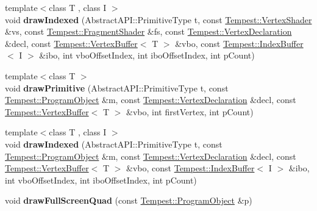 \begin{DoxyCompactItemize}
\item 
\hypertarget{class_tempest_1_1_device_a67e0ed5a99978956b5b11202548c1b2c}{{\footnotesize template$<$class T , class I $>$ }\\void {\bfseries draw\+Indexed} (Abstract\+A\+P\+I\+::\+Primitive\+Type t, const \hyperlink{class_tempest_1_1_vertex_shader}{Tempest\+::\+Vertex\+Shader} \&vs, const \hyperlink{class_tempest_1_1_fragment_shader}{Tempest\+::\+Fragment\+Shader} \&fs, const \hyperlink{class_tempest_1_1_vertex_declaration}{Tempest\+::\+Vertex\+Declaration} \&decl, const \hyperlink{class_tempest_1_1_vertex_buffer}{Tempest\+::\+Vertex\+Buffer}$<$ T $>$ \&vbo, const \hyperlink{class_tempest_1_1_index_buffer}{Tempest\+::\+Index\+Buffer}$<$ I $>$ \&ibo, int vbo\+Offset\+Index, int ibo\+Offset\+Index, int p\+Count)}\label{class_tempest_1_1_device_a67e0ed5a99978956b5b11202548c1b2c}

\item 
\hypertarget{class_tempest_1_1_device_a8d49c4eb70e1c6203ee73cff3f8f007d}{{\footnotesize template$<$class T $>$ }\\void {\bfseries draw\+Primitive} (Abstract\+A\+P\+I\+::\+Primitive\+Type t, const \hyperlink{class_tempest_1_1_program_object}{Tempest\+::\+Program\+Object} \&m, const \hyperlink{class_tempest_1_1_vertex_declaration}{Tempest\+::\+Vertex\+Declaration} \&decl, const \hyperlink{class_tempest_1_1_vertex_buffer}{Tempest\+::\+Vertex\+Buffer}$<$ T $>$ \&vbo, int first\+Vertex, int p\+Count)}\label{class_tempest_1_1_device_a8d49c4eb70e1c6203ee73cff3f8f007d}

\item 
\hypertarget{class_tempest_1_1_device_aab3ed8c11683518c1179a5dcfa687039}{{\footnotesize template$<$class T , class I $>$ }\\void {\bfseries draw\+Indexed} (Abstract\+A\+P\+I\+::\+Primitive\+Type t, const \hyperlink{class_tempest_1_1_program_object}{Tempest\+::\+Program\+Object} \&m, const \hyperlink{class_tempest_1_1_vertex_declaration}{Tempest\+::\+Vertex\+Declaration} \&decl, const \hyperlink{class_tempest_1_1_vertex_buffer}{Tempest\+::\+Vertex\+Buffer}$<$ T $>$ \&vbo, const \hyperlink{class_tempest_1_1_index_buffer}{Tempest\+::\+Index\+Buffer}$<$ I $>$ \&ibo, int vbo\+Offset\+Index, int ibo\+Offset\+Index, int p\+Count)}\label{class_tempest_1_1_device_aab3ed8c11683518c1179a5dcfa687039}

\item 
\hypertarget{class_tempest_1_1_device_a43a09d88152dc0ab3601a2a63cbd1710}{void {\bfseries draw\+Full\+Screen\+Quad} (const \hyperlink{class_tempest_1_1_program_object}{Tempest\+::\+Program\+Object} \&p)}\label{class_tempest_1_1_device_a43a09d88152dc0ab3601a2a63cbd1710}


\end{DoxyCompactItemize}
